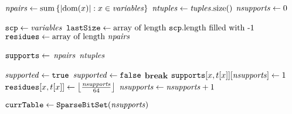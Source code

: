       \STATE $\mathit{npairs} \leftarrow \mathrm{sum}\left\{|\text{dom}({x})| : x \in \mathit{variables}\right\}$
      \label{line:init:3}
      \STATE $\mathit{ntuples} \leftarrow \mathit{tuples}.\mathrm{size}()$ 
      \STATE $\mathit{nsupports} \leftarrow 0$  \label{line:init:4}
      
      \STATE $\texttt{scp} \leftarrow \mathit{variables}$ \label{line:init:1}
      \STATE $\texttt{lastSize} \leftarrow \text{array of  length~} \texttt{scp}.\mathrm{length}
      ~\text{filled with -1}$  \label{line:init:2}
      \STATE $\texttt{residues} \leftarrow \text{array of length~} \mathit{npairs}$ \label{line:init:9}
      
      \STATE $\texttt{supports} \leftarrow$ $\mathit{npairs}$
      $\mathit{ntuples}$ \label{line:init:5}

       \label{line:init:6}
        \STATE $\mathit{supported} \leftarrow \texttt{true}$
            \STATE $\mathit{supported} \leftarrow \texttt{false}$
            \STATE $\textbf{break}$ 
          \ENDIF
        \ENDFOREACH
             \label{line:init:9}
              \STATE $\texttt{supports}[x,t[x]][\mathit{nsupports}] \leftarrow 1$ \label{line:init:10}
              \STATE $\texttt{residues}[x,t[x]] \leftarrow \left\lfloor\frac{\mathit{nsupports}}{64}\right\rfloor$
              \label{line:init:11}
              \STATE $\mathit{nsupports} \leftarrow \mathit{nsupports} + 1$
            \ENDFOREACH
          \ENDIF
      \ENDFOREACH \label{line:init:7}

       \label{line:init:12}
          \label{line:init:14}
      \ENDFOREACH
      \STATE $\texttt{currTable} \leftarrow \texttt{SparseBitSet}(\mathit{nsupports})$ 
       \label{line:init:15}
      \Endfunc
